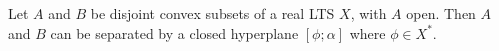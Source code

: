 Let $A$ and $B$ be disjoint convex subsets of a real LTS $X$, with $A$ open. Then $A$ and $B$ can be separated by a closed hyperplane $[\phi; \alpha]$ where $\phi \in X^*$.